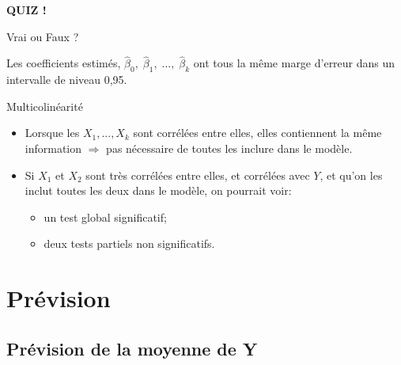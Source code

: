 \documentclass{BeamerTemplate}
\begin{document}
\begin{frame}[t]{ }

\centerline{\LARGE\bf \alert{QUIZ !}}
\bigskip

Vrai ou Faux ?

\bigskip

 Les coefficients estimés, $\hat\beta_0, \;\hat\beta_1, \;...,\;\hat\beta_k$ ont tous la même marge d'erreur dans un intervalle de niveau 0,95.

\end{frame}



\begin{frame}[t]{Multicolinéarité }

{\small
\begin{itemize}%
\item Lorsque les $X_1,...,X_k$ sont corrélées entre elles, elles contiennent la même information $\Rightarrow$ pas nécessaire de toutes les inclure dans le modèle.
\item Si $X_1$ et $X_2$ sont très corrélées entre elles, et corrélées avec $Y$, et qu'on les inclut toutes les deux dans le modèle, on pourrait voir:
    \begin{itemize}
    \item un test global significatif;
    \item deux tests partiels non significatifs.
    \end{itemize}

\end{itemize}
}

\end{frame}



\section{Prévision}


\subsection{Prévision de la moyenne de Y}
\end{document}
